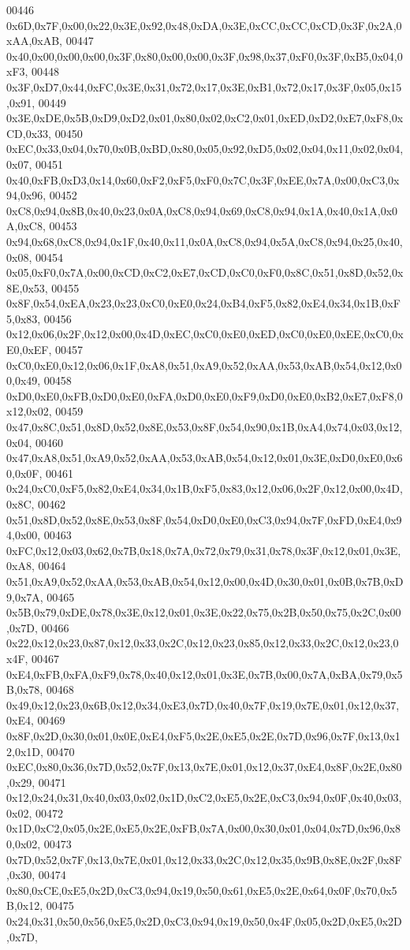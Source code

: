 \begin{DoxyCode}
00446 0x6D,0x7F,0x00,0x22,0x3E,0x92,0x48,0xDA,0x3E,0xCC,0xCC,0xCD,0x3F,0x2A,0xAA,0xAB,
00447 0x40,0x00,0x00,0x00,0x3F,0x80,0x00,0x00,0x3F,0x98,0x37,0xF0,0x3F,0xB5,0x04,0xF3,
00448 0x3F,0xD7,0x44,0xFC,0x3E,0x31,0x72,0x17,0x3E,0xB1,0x72,0x17,0x3F,0x05,0x15,0x91,
00449 0x3E,0xDE,0x5B,0xD9,0xD2,0x01,0x80,0x02,0xC2,0x01,0xED,0xD2,0xE7,0xF8,0xCD,0x33,
00450 0xEC,0x33,0x04,0x70,0x0B,0xBD,0x80,0x05,0x92,0xD5,0x02,0x04,0x11,0x02,0x04,0x07,
00451 0x40,0xFB,0xD3,0x14,0x60,0xF2,0xF5,0xF0,0x7C,0x3F,0xEE,0x7A,0x00,0xC3,0x94,0x96,
00452 0xC8,0x94,0x8B,0x40,0x23,0x0A,0xC8,0x94,0x69,0xC8,0x94,0x1A,0x40,0x1A,0x0A,0xC8,
00453 0x94,0x68,0xC8,0x94,0x1F,0x40,0x11,0x0A,0xC8,0x94,0x5A,0xC8,0x94,0x25,0x40,0x08,
00454 0x05,0xF0,0x7A,0x00,0xCD,0xC2,0xE7,0xCD,0xC0,0xF0,0x8C,0x51,0x8D,0x52,0x8E,0x53,
00455 0x8F,0x54,0xEA,0x23,0x23,0xC0,0xE0,0x24,0xB4,0xF5,0x82,0xE4,0x34,0x1B,0xF5,0x83,
00456 0x12,0x06,0x2F,0x12,0x00,0x4D,0xEC,0xC0,0xE0,0xED,0xC0,0xE0,0xEE,0xC0,0xE0,0xEF,
00457 0xC0,0xE0,0x12,0x06,0x1F,0xA8,0x51,0xA9,0x52,0xAA,0x53,0xAB,0x54,0x12,0x00,0x49,
00458 0xD0,0xE0,0xFB,0xD0,0xE0,0xFA,0xD0,0xE0,0xF9,0xD0,0xE0,0xB2,0xE7,0xF8,0x12,0x02,
00459 0x47,0x8C,0x51,0x8D,0x52,0x8E,0x53,0x8F,0x54,0x90,0x1B,0xA4,0x74,0x03,0x12,0x04,
00460 0x47,0xA8,0x51,0xA9,0x52,0xAA,0x53,0xAB,0x54,0x12,0x01,0x3E,0xD0,0xE0,0x60,0x0F,
00461 0x24,0xC0,0xF5,0x82,0xE4,0x34,0x1B,0xF5,0x83,0x12,0x06,0x2F,0x12,0x00,0x4D,0x8C,
00462 0x51,0x8D,0x52,0x8E,0x53,0x8F,0x54,0xD0,0xE0,0xC3,0x94,0x7F,0xFD,0xE4,0x94,0x00,
00463 0xFC,0x12,0x03,0x62,0x7B,0x18,0x7A,0x72,0x79,0x31,0x78,0x3F,0x12,0x01,0x3E,0xA8,
00464 0x51,0xA9,0x52,0xAA,0x53,0xAB,0x54,0x12,0x00,0x4D,0x30,0x01,0x0B,0x7B,0xD9,0x7A,
00465 0x5B,0x79,0xDE,0x78,0x3E,0x12,0x01,0x3E,0x22,0x75,0x2B,0x50,0x75,0x2C,0x00,0x7D,
00466 0x22,0x12,0x23,0x87,0x12,0x33,0x2C,0x12,0x23,0x85,0x12,0x33,0x2C,0x12,0x23,0x4F,
00467 0xE4,0xFB,0xFA,0xF9,0x78,0x40,0x12,0x01,0x3E,0x7B,0x00,0x7A,0xBA,0x79,0x5B,0x78,
00468 0x49,0x12,0x23,0x6B,0x12,0x34,0xE3,0x7D,0x40,0x7F,0x19,0x7E,0x01,0x12,0x37,0xE4,
00469 0x8F,0x2D,0x30,0x01,0x0E,0xE4,0xF5,0x2E,0xE5,0x2E,0x7D,0x96,0x7F,0x13,0x12,0x1D,
00470 0xEC,0x80,0x36,0x7D,0x52,0x7F,0x13,0x7E,0x01,0x12,0x37,0xE4,0x8F,0x2E,0x80,0x29,
00471 0x12,0x24,0x31,0x40,0x03,0x02,0x1D,0xC2,0xE5,0x2E,0xC3,0x94,0x0F,0x40,0x03,0x02,
00472 0x1D,0xC2,0x05,0x2E,0xE5,0x2E,0xFB,0x7A,0x00,0x30,0x01,0x04,0x7D,0x96,0x80,0x02,
00473 0x7D,0x52,0x7F,0x13,0x7E,0x01,0x12,0x33,0x2C,0x12,0x35,0x9B,0x8E,0x2F,0x8F,0x30,
00474 0x80,0xCE,0xE5,0x2D,0xC3,0x94,0x19,0x50,0x61,0xE5,0x2E,0x64,0x0F,0x70,0x5B,0x12,
00475 0x24,0x31,0x50,0x56,0xE5,0x2D,0xC3,0x94,0x19,0x50,0x4F,0x05,0x2D,0xE5,0x2D,0x7D,

\end{DoxyCode}
